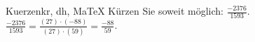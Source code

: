\begin{MAufgabe}{Kuerzen}{kr, dh, MaTeX}
K\"urzen Sie soweit m\"oglich: $\frac{-2376}{1593}$.\\ 
\ifLsg\MLoesung
\quad $\frac{-2376}{1593}=\frac{(27)\cdot(-88)}{(27)\cdot(59)}=\frac{-88}{59}$.\else\relax\fi
 \end{MAufgabe}